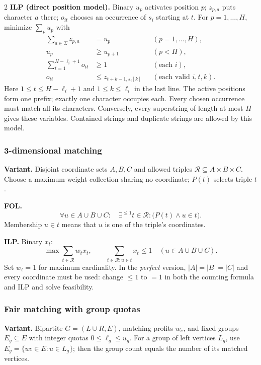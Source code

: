 \documentclass[8pt]{extarticle}
\theoremstyle{definition}
\begin{document}
\begin{multicols*}{2}
\textbf{ILP (direct position model).} Binary $u_p$ activates position $p$;
$z_{p,a}$ puts character $a$ there; $o_{it}$ chooses an occurrence of $s_i$
starting at $t$. For $p=1,\ldots,H$, minimize $\sum_pu_p$ with
\[
\begin{aligned}
 \sum_{a\in\Sigma}z_{p,a}&=u_p &&(p=1,\ldots,H),\\
 u_p&\ge u_{p+1} &&(p<H),\\
 \sum_{t=1}^{H-\ell_i+1}o_{it}&\ge1 &&(\text{each }i),\\
 o_{it}&\le z_{t+k-1,s_i[k]} &&(\text{each valid }i,t,k).
\end{aligned}
\]
Here $1\le t\le H-\ell_i+1$ and $1\le k\le\ell_i$ in the last line.
The active positions form one prefix; exactly one character occupies each.
Every chosen occurrence must match all its characters. Conversely, every
superstring of length at most $H$ gives these variables. Contained strings
and duplicate strings are allowed by this model.

\subsubsection{3-dimensional matching}\label{form:3dm}
\textbf{Variant.} Disjoint coordinate sets $A,B,C$ and allowed triples
$\mathcal R\subseteq A\times B\times C$. Choose a maximum-weight collection
sharing no coordinate; $P(t)$ selects triple $t$.

\textbf{FOL.}
\[
 \forall u\in A\cup B\cup C:\quad
 \exists^{\le1}t\in\mathcal R:\bigl(P(t)\land u\in t\bigr).
\]
Membership $u\in t$ means that $u$ is one of the triple's coordinates.

\textbf{ILP.} Binary $x_t$:
\[
 \max\sum_{t\in\mathcal R}w_tx_t,\qquad
 \sum_{t\in\mathcal R:u\in t}x_t\le1\quad(u\in A\cup B\cup C).
\]
Set $w_t=1$ for maximum cardinality. In the \emph{perfect} version,
$|A|=|B|=|C|$ and every coordinate must be used: change $\le1$ to $=1$
in both the counting formula and ILP and solve feasibility.

\subsubsection{Fair matching with group quotas}\label{form:fair}
\textbf{Variant.} Bipartite $G=(L\cup R,E)$, matching profits $w_e$, and
fixed groups $E_g\subseteq E$ with integer quotas $0\le\ell_g\le u_g$.
For a group of left vertices $L_g$, use $E_g=\{uv\in E:u\in L_g\}$;
then the group count equals the number of its matched vertices.


\end{multicols*}
\end{document}
